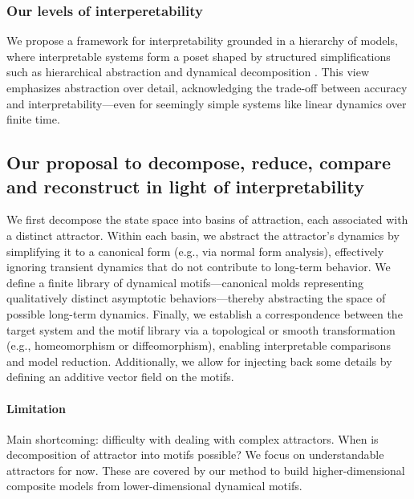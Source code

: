 \documentclass{article}
\theoremstyle{definition} \newtheorem{definition}{Definition}  \newtheorem{example}{Example}
\theoremstyle{remark} \newtheorem{remark}{Remark}
\newcounter{ct}
\begin{document}
\subsubsection{Our levels of interperetability}
We propose a framework for interpretability grounded in a hierarchy of models, where interpretable systems form a poset shaped by structured simplifications such as hierarchical abstraction and dynamical decomposition \citep{Vermani2024b, geadah2024parsing, geadah2025modeling}.
This view emphasizes abstraction over detail, acknowledging the trade-off between accuracy and interpretability—even for seemingly simple systems like linear dynamics over finite time.


\subsection{Our proposal to decompose, reduce, compare and reconstruct in light of interpretability}
We first decompose the state space into basins of attraction, each associated with a distinct attractor.
%
Within each basin, we abstract the attractor's dynamics by simplifying it to a canonical form (e.g., via normal form analysis), effectively ignoring transient dynamics that do not contribute to long-term behavior.
%
We define a finite library of dynamical motifs—canonical molds representing qualitatively distinct asymptotic behaviors—thereby abstracting the space of possible long-term dynamics.
%
Finally, we establish a correspondence between the target system and the motif library via a topological or smooth transformation (e.g., homeomorphism or diffeomorphism), enabling interpretable comparisons and model reduction.
%
Additionally, we allow for injecting back some details by defining an additive vector field on the motifs.


\paragraph{Limitation}
Main shortcoming: difficulty with dealing with complex attractors.
When is decomposition of attractor into motifs possible?
We focus on understandable attractors for now. 
These are covered by our method to build higher-dimensional composite models from lower-dimensional dynamical motifs.
\end{document}
